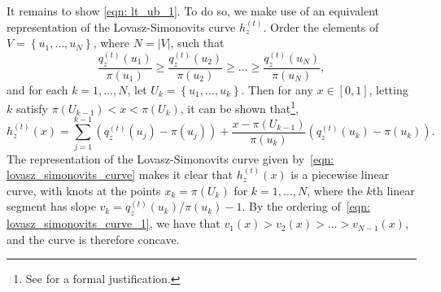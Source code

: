 \documentclass[11pt,twoside]{article}
\theoremstyle{definition}
\newcommand{\set}[1]{\left\{#1\right\}}
\newcommand{\abs}[1]{\left \lvert #1 \right \rvert}
\newcommand{\1}{\mathbbm{1}}
\begin{document}
It remains to show \eqref{eqn: lt_ub_1}. To do so, we make use of an equivalent representation of the Lovasz-Simonovits curve $h_z^{(t)}$. Order the elements of $V = \set{u_1, \ldots, u_N}$, where $N = \abs{V}$, such that
\begin{equation}
\label{eqn: lovasz_simonovits_curve_1}
\frac{q_z^{(t)}(u_1)}{\pi(u_1)} \geq \frac{q_z^{(t)}(u_2)}{\pi(u_2)} \geq \ldots \geq \frac{q_z^{(t)}(u_N)}{\pi(u_N)},
\end{equation}
and for each $k = 1,\ldots, N$, let $U_k = \set{u_1, \ldots, u_k}$. Then for any $x \in [0,1]$, letting $k$ satisfy $\pi(U_{k - 1}) < x < \pi(U_k)$, it can be shown that\footnote{See \cite{lovasz1990} for a formal justification.},
\begin{equation}
\label{eqn: lovasz_simonovits_curve}
h_z^{(t)}(x) = \sum_{j = 1}^{k - 1} (q_z^{(t)}(u_j) - \pi(u_j)) + \frac{x - \pi(U_{k - 1})}{\pi(u_k)} \left(q_z^{(t)}(u_k) - \pi(u_k) \right).
\end{equation}
The representation of the Lovasz-Simonovits curve given by~\eqref{eqn: lovasz_simonovits_curve} makes it clear that $h_z^{(t)}(x)$ is a piecewise linear curve, with knots at the points $x_k = \pi(U_k)$ for $k = 1,\ldots,N$, where the $k$th linear segment has slope $v_k = q_z^{(t)}(u_{k})/\pi(u_{k}) - 1$. By the ordering of~\eqref{eqn: lovasz_simonovits_curve_1}, we have that $v_1(x) > v_2(x) > \ldots > v_{N-1}(x)$, and the curve is therefore concave. 
\end{document}
